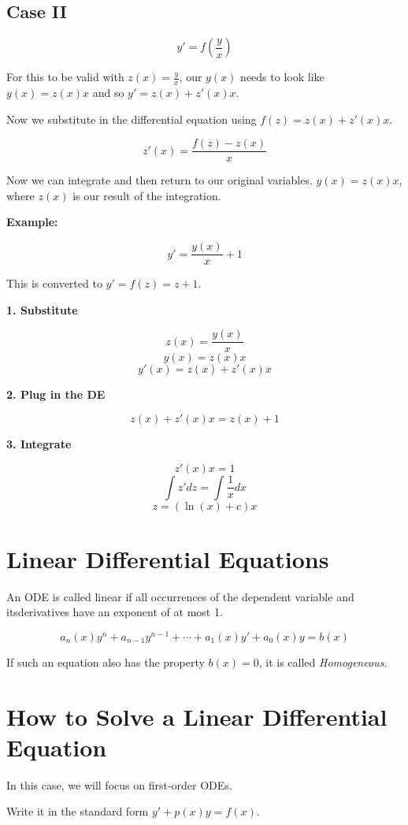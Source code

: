\subsection{Case II}

\[
    y' = f(\frac{y}{x})
\]

For this to be valid with \(z(x) = \frac{y}{x}\), our \(y(x)\) needs to look like \(y(x) = z(x)x\)
and so \(y' = z(x) + z'(x)x\).

Now we substitute in the differential equation using \(f(z) = z(x) + z'(x)x\).

\[
    z'(x) = \frac{f(z) - z(x)}{x}
\]

Now we can integrate and then return to our original variables. \(y(x) = z(x)x \), where \(z(x)\) is our
result of the integration.

\textbf{Example:}

\[
    y' = \frac{y(x)}{x} + 1
\]

This is converted to \(y' = f(z) = z + 1\).

\textbf{1. Substitute}

\[
    z(x) = \frac{y(x)}{x}
\]
\[
    y(x) = z(x)x
\]
\[
    y'(x) = z(x) + z'(x)x
\]

\textbf{2. Plug in the DE}

\[
    z(x) + z'(x)x = z(x) + 1
\]

\textbf{3. Integrate}

\[
    z'(x)x = 1
\]
\[
    \int z' dz = \int \frac{1}{x} dx
\]
\[
    z = (\ln(x) + c)x
\]

\section{Linear Differential Equations}

An ODE is called linear if all occurrences of the dependent variable and itsderivatives have an exponent of at most 1.

\[
    a_n(x)y^n + a_{n - 1}y^{n -1} + \cdots + a_1(x)y' + a_0(x)y = b(x)
\]

If such an equation also has the property \(b(x) = 0\), it is called \emph{Homogeneous}.

\section{How to Solve a Linear Differential Equation}

In this case, we will focus on first-order ODEs.

Write it in the standard form \(y' + p(x)y = f(x)\).

